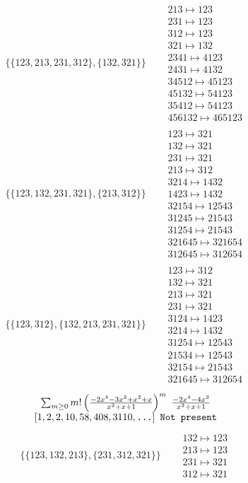 \begin{tiny}
\begin{align}
\begin{matrix}
\end{matrix}
\\
\{\{123, 213, 231, 312\}, \{132, 321\}\}
\quad
&
\begin{matrix}
213 \mapsto 123\\231 \mapsto 123\\312 \mapsto 123\\321 \mapsto 132\\2341 \mapsto 4123\\2431 \mapsto 4132\\34512 \mapsto 45123\\45132 \mapsto 54123\\35412 \mapsto 54123\\456132 \mapsto 465123
\end{matrix}
\\
\{\{123, 132, 231, 321\}, \{213, 312\}\}
\quad
&
\begin{matrix}
123 \mapsto 321\\132 \mapsto 321\\231 \mapsto 321\\213 \mapsto 312\\3214 \mapsto 1432\\1423 \mapsto 1432\\32154 \mapsto 12543\\31245 \mapsto 21543\\31254 \mapsto 21543\\321645 \mapsto 321654\\312645 \mapsto 312654
\end{matrix}
\\
\{\{123, 312\}, \{132, 213, 231, 321\}\}
\quad
&
\begin{matrix}
123 \mapsto 312\\132 \mapsto 321\\213 \mapsto 321\\231 \mapsto 321\\3124 \mapsto 1423\\3214 \mapsto 1432\\31254 \mapsto 12543\\21534 \mapsto 12543\\32154 \mapsto 21543\\321645 \mapsto 312654
\end{matrix}
\end{align}
$$
\begin{matrix}
\sum_{m \geq 0} m! \left(
\frac{-2 x^{4} - 3 x^{3} + x^{2} + x}{x^{2} + x + 1}
\right)^m
\ 
\frac{-2 x^{4} - 4 x^{3}}{x^{2} + x + 1}
\\
\left[1, 2, 2, 10, 58, 408, 3110, \text{\texttt{...}}\right]
\ 
\texttt{Not present}
\end{matrix}
$$
\vspace{-1em}
\begin{align}
\{\{123, 132, 213\}, \{231, 312, 321\}\}
\quad
&
\begin{matrix}
132 \mapsto 123\\213 \mapsto 123\\231 \mapsto 321\\312 \mapsto 321
\end{matrix}
\end{align}
\end{tiny}
